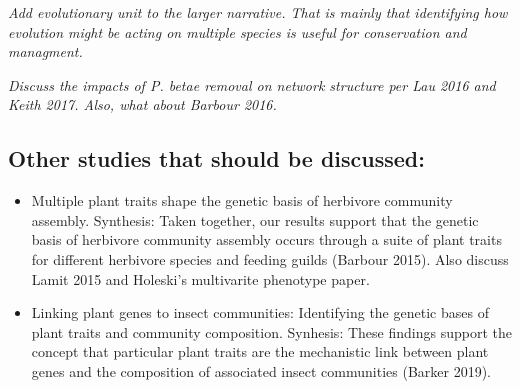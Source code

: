\documentclass[11pt,twocolumn,twoside,lineno]{pnas-new}
\begin{document}
\textit{Add evolutionary unit to the larger narrative. That is mainly
  that identifying how evolution might be acting on multiple species
  is useful for conservation and managment.}


\textit{Discuss the impacts of P. betae removal on network structure
  per Lau 2016 and Keith 2017. Also, what about Barbour 2016.}


\subsection*{Other studies that should be discussed:}

\begin{itemize}
\item Multiple plant traits shape the genetic basis of herbivore
  community assembly. Synthesis: Taken together, our results support
  that the genetic basis of herbivore community assembly occurs
  through a suite of plant traits for different herbivore species and
  feeding guilds (Barbour 2015). Also discuss Lamit 2015 and Holeski's
  multivarite phenotype paper.
\item Linking plant genes to insect communities:  Identifying the
  genetic bases of plant traits and community composition. Synhesis:
  These findings support the concept that particular plant traits are
  the mechanistic link between plant genes and the composition of
  associated insect communities (Barker 2019).
\end{itemize}



\end{document}
